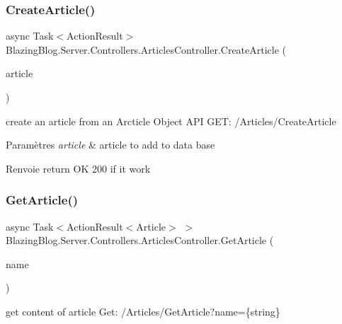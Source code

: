 \subsubsection{\texorpdfstring{Create\+Article()}{CreateArticle()}}
{\footnotesize\ttfamily async Task$<$Action\+Result$>$ Blazing\+Blog.\+Server.\+Controllers.\+Articles\+Controller.\+Create\+Article (\begin{DoxyParamCaption}\item[{\mbox{[}\+From\+Body\mbox{]} Article}]{article }\end{DoxyParamCaption})\hspace{0.3cm}{\ttfamily [inline]}}



create an article from an Arcticle Object A\+PI G\+ET\+: /\+Articles/\+Create\+Article 


\begin{DoxyParams}{Paramètres}
{\em article} & article to add to data base\\
\hline
\end{DoxyParams}
\begin{DoxyReturn}{Renvoie}
return OK 200 if it work
\end{DoxyReturn}
\mbox{\label{class_blazing_blog_1_1_server_1_1_controllers_1_1_articles_controller_a69e1b42a4f3198d4737296e661f95a75}} 
\subsubsection{\texorpdfstring{Get\+Article()}{GetArticle()}}
{\footnotesize\ttfamily async Task$<$Action\+Result$<$Article$>$ $>$ Blazing\+Blog.\+Server.\+Controllers.\+Articles\+Controller.\+Get\+Article (\begin{DoxyParamCaption}\item[{\mbox{[}\+From\+Query\mbox{]} string}]{name }\end{DoxyParamCaption})\hspace{0.3cm}{\ttfamily [inline]}}



get content of article Get\+: /\+Articles/\+Get\+Article?name=\{string\} 


